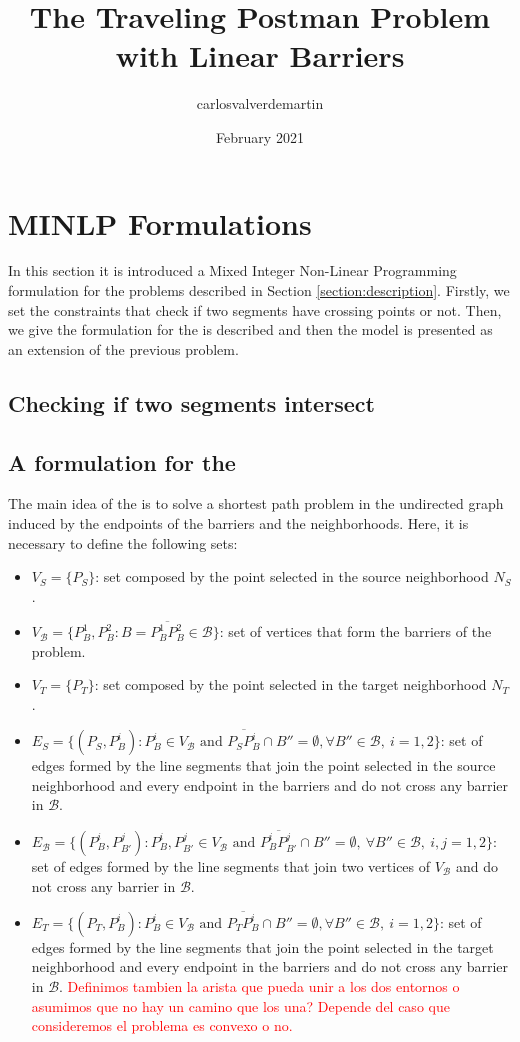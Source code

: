 \documentclass[a4paper]{elsarticle}
\title{The Traveling Postman Problem with Linear Barriers}
\author{carlosvalverdemartin }
\date{February 2021}
\newcommand{\SPP}{{\sf{H-SPP-S} \xspace}}
\newcommand{\TSP}{{\sf{H-TSP-S} \xspace}}
\newcommand{\B}{{\mathcal B}}
\newcommand{\VB}{{V^{}_{\mathcal B}}}
\newcommand{\EB}{{E^{}_{\mathcal B}}}
\newcommand{\VS}{{V^{}_{S}}}
\newcommand{\ES}{{E^{}_{S}}}
\newcommand{\VT}{{V^{}_{T}}}
\newcommand{\ET}{{E^{}_{T}}}
\begin{document}
\section{MINLP Formulations}

In this section it is introduced a Mixed Integer Non-Linear Programming formulation for the problems described in Section \ref{section:description}. Firstly, we set the constraints that check if two segments have crossing points or not. Then, we give the formulation for the \SPP is described and then the model \TSP is presented as an extension of the previous problem.

\subsection{Checking if two segments intersect}


\subsection{A formulation for the \SPP}
The main idea of the \SPP is to solve a shortest path problem in the undirected graph induced by the endpoints of the barriers and the neighborhoods. Here, it is necessary to define the following sets:
\begin{itemize}
\item $\VS=\{P_S\}$: set composed by the point selected in the source neighborhood $N_S$.
\item $\VB=\{P^1_B, P^2_B:B=\overline{P^1_B P^2_B}\in \mathcal B\}$: set of vertices that form the barriers of the problem.
\item $\VT=\{P^{}_T\}$: set composed by the point selected in the target neighborhood $N_T$.
\item $\ES=\{(P_S, P^i_{B}):P^i_B\in V_\B\text{ and } \overline{P_SP^i_B}\cap B''=\emptyset,\forall B''\in\B,\:i=1,2\}$: set of edges formed by the line segments that join the point selected in the source neighborhood and every endpoint in the barriers and do not cross any barrier in $\B$.
\item $\EB=\{(P^{i}_B, P^{j}_{B'}):P^i_B, P^j_{B'}\in \VB \text{ and } \overline{P^i_B P^j_{B'}}\cap B''=\emptyset,\:\forall B''\in\mathcal B,\:i, j=1,2\}$: set of edges formed by the line segments that join two vertices of $V_{\mathcal B}$ and do not cross any barrier in $\B$.
\item $\ET=\{(P^{}_T, P^i_{B}):P^i_B\in V_\B\text{ and } \overline{P^{}_TP^i_B}\cap B''=\emptyset,\forall B''\in\B,\:i=1,2\}$: set of edges formed by the line segments that join the point selected in the target neighborhood and every endpoint in the barriers and do not cross any barrier in $\B$.
\textcolor{red}{Definimos tambien la arista que pueda unir a los dos entornos o asumimos que no hay un camino que los una? Depende del caso que consideremos el problema es convexo o no.}
\end{itemize} 
\end{document}
